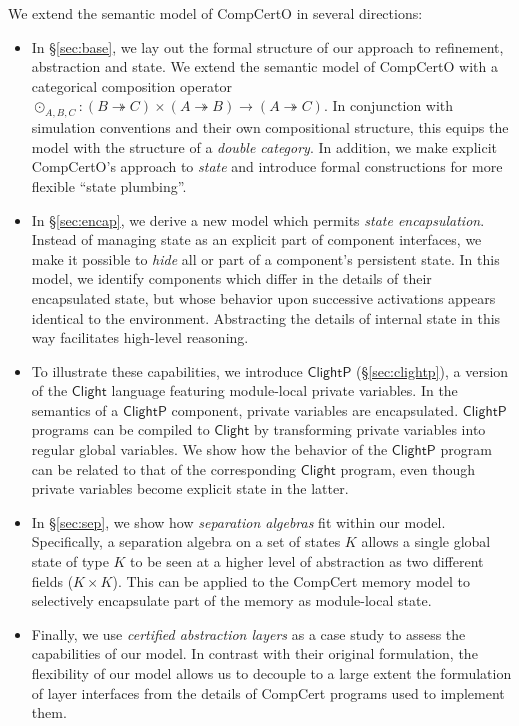 \documentclass[acmsmall,screen,review,anonymous]{acmart}
\newcommand{\ClightP}{\ensuremath{ \mathsf{ClightP} }}
\newcommand{\Clight}{\ensuremath{ \mathsf{Clight} }}
\begin{document}
We extend the semantic model of CompCertO in several directions:
\begin{itemize}
\item
  In \S\ref{sec:base},
  we lay out the formal structure of
  our approach to refinement, abstraction and state.
  We extend the semantic model of CompCertO
  with a categorical composition operator
  ${\odot}_{A,B,C} : (B \twoheadrightarrow C) \times (A \twoheadrightarrow B)
    \rightarrow (A \twoheadrightarrow C)$.
  In conjunction with simulation conventions and their own compositional structure,
  this equips the model with the structure of a \emph{double category}.
  In addition,
  we make explicit CompCertO's approach to \emph{state}
  and introduce formal constructions
  for more flexible ``state plumbing''.
\item 
  In \S\ref{sec:encap},
  we derive a new model
  which permits \emph{state encapsulation}.
  Instead of managing state as an explicit part of component interfaces,
  we make it possible to \emph{hide}
  all or part of a component's persistent state.
  In this model,
  we identify components which differ in
  the details of their encapsulated state,
  but whose behavior upon successive activations
  appears identical to the environment.
  Abstracting the details of internal state in this way
  facilitates high-level reasoning.
\item
  To illustrate these capabilities,
  we introduce $\ClightP$ (\S\ref{sec:clightp}),
  a version of the $\Clight$ language
  featuring module-local private variables.
  In the semantics of a $\ClightP$ component,
  private variables are encapsulated.
  $\ClightP$ programs can be compiled to $\Clight$
  by transforming private variables into
  regular global variables.
  We show how the behavior of the $\ClightP$ program
  can be related to that of the corresponding $\Clight$ program,
  even though private variables become explicit state in the latter.
\item
  In \S\ref{sec:sep},
  we show how \emph{separation algebras} fit within our model.
  Specifically,
  a separation algebra on a set of states $K$
  allows a single global state of type $K$
  to be seen at a higher level of abstraction
  as two different fields ($K \times K$).
  This can be applied to the CompCert memory model
  to selectively encapsulate part of the memory
  as module-local state.
\item
  Finally,
  we use \emph{certified abstraction layers} \cite{popl15}
  as a case study to assess the capabilities of our model.
  In contrast with their original formulation,
  the flexibility of our model allows us
  to decouple to a large extent
  the formulation of layer interfaces
  from the details of CompCert programs
  used to implement them.
\end{itemize}
\end{document}
